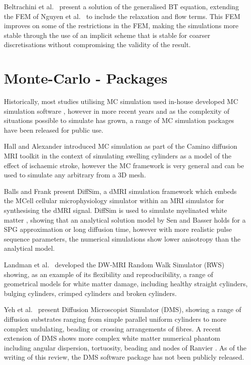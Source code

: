 Beltrachini et al.\ \cite{Beltrachini2016} present a solution of the generalised BT equation, extending the FEM of Nguyen et al.\ \cite{Nguyen2014} to include the relaxation and flow terms. This FEM improves on some of the restrictions in the FEM, making the simulations more stable through the use of an implicit scheme that is stable for coarser discretisations without compromising the validity of the result. 


\section{Monte-Carlo - Packages}
\label{sec:app_monte_carlo_packages}
Historically, most studies utilising MC simulation used in-house developed MC simulation software \cite{Lipinski1990, Szafer1995,Stanisz1997, Duh2001}, however in more recent years and as the complexity of situations possible to simulate has grown, a range of MC simulation packages have been released for public use.

Hall and Alexander \cite{Hall2009} introduced MC simulation as part of the Camino diffusion MRI toolkit \cite{Cook2006} in the context of simulating swelling cylinders as a model of the effect of ischaemic stroke, however the MC framework is very general and can be used to simulate any arbitrary from a 3D mesh. 

Balls and Frank \cite{Balls2009} present DiffSim, a dMRI simulation framework which embeds the MCell \cite{Stiles1996,Stiles2001, Kerr2008} cellular microphysiology simulator within an MRI simulator for synthesising the dMRI signal.
DiffSim is used to simulate myelinated white matter \cite{Baxter2013}, showing that an analytical solution model by Sen and Basser \cite{Sen2005} holds for a SPG approximation or long diffusion time, however with more realistic pulse sequence parameters, the numerical simulations show lower anisotropy than the analytical model. 

Landman et al.\ \cite{Landman2010} developed the DW-MRI Random Walk Simulator (RWS) showing, as an example of its flexibility and reproducibility, a range of geometrical models for white matter damage, including healthy straight cylinders, bulging cylinders, crimped cylinders and broken cylinders.

Yeh et al.\ \cite{Yeh2013} present Diffusion Microscopist Simulator (DMS), showing a range of diffusion substrates ranging from simple parallel uniform cylinders to more complex undulating, beading or crossing arrangements of fibres.
A recent extension of DMS shows more complex white matter numerical phantom including angular dispersion, tortuosity, beading and nodes of Ranvier \cite{Ginsburger2018}.
As of the writing of this review, the DMS software package has not been publicly released. 

